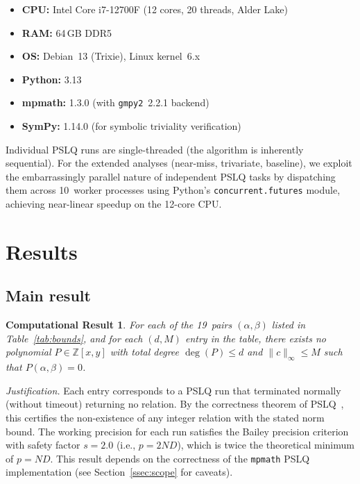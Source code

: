 \documentclass[11pt]{amsart}
\newtheorem{result}[theorem]{Computational Result}
\theoremstyle{remark}
\newcommand{\Z}{\mathbb{Z}}
\newcommand{\norm}[1]{\lVert #1 \rVert}
\begin{document}
\begin{itemize}
\item \textbf{CPU:} Intel Core i7-12700F (12 cores, 20 threads, Alder Lake)
\item \textbf{RAM:} 64\,GB DDR5
\item \textbf{OS:} Debian~13 (Trixie), Linux kernel~6.x
\item \textbf{Python:} 3.13
\item \textbf{mpmath:} 1.3.0 (with \texttt{gmpy2}~2.2.1 backend)
\item \textbf{SymPy:} 1.14.0 (for symbolic triviality verification)
\end{itemize}
Individual PSLQ runs are single-threaded (the algorithm is inherently sequential).
For the extended analyses (near-miss, trivariate, baseline), we exploit the
embarrassingly parallel nature of independent PSLQ tasks by dispatching them across
10~worker processes using Python's \texttt{concurrent.futures} module,
achieving near-linear speedup on the 12-core CPU.

\section{Results}\label{sec:results}

\subsection{Main result}\label{ssec:mainresult}

\begin{result}\label{res:main}
For each of the 19~pairs $(\alpha,\beta)$ listed in Table~\ref{tab:bounds}, and for
each $(d,M)$ entry in the table, there exists no polynomial $P\in\Z[x,y]$ with total
degree $\deg(P)\le d$ and $\norm{c}_\infty\le M$ such that $P(\alpha,\beta)=0$.
\end{result}

\noindent\textit{Justification.}
Each entry corresponds to a PSLQ run that terminated normally (without timeout)
returning no relation. By the correctness theorem of
PSLQ~\cite[Theorem~1]{FergusonBaileyArno1999}, this certifies the non-existence of
any integer relation with the stated norm bound. The working precision for each run
satisfies the Bailey precision criterion with safety factor $s=2.0$ (i.e.,
$p=2ND$), which is twice the theoretical minimum of $p=ND$. This result depends on
the correctness of the \texttt{mpmath} PSLQ implementation (see
Section~\ref{ssec:scope} for caveats).
\end{document}
